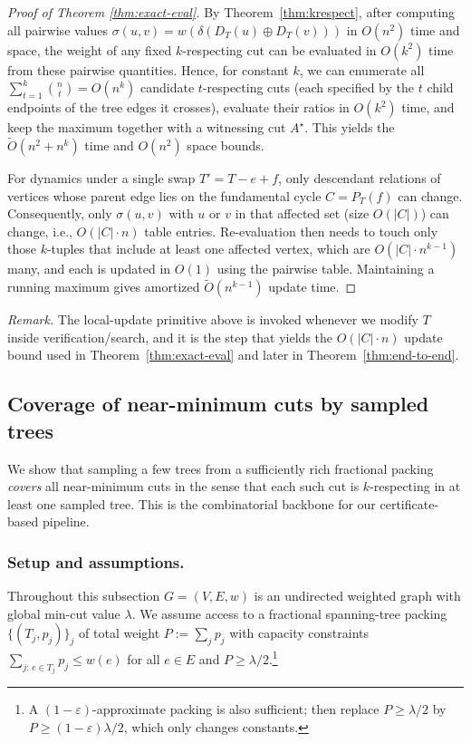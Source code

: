 \documentclass[11pt,letterpaper]{article}
\begin{document}
\begin{proof}[Proof of Theorem \ref{thm:exact-eval}]
By Theorem~\ref{thm:krespect}, after computing all pairwise
values $\sigma(u,v)=w(\delta(D_T(u)\oplus D_T(v)))$ in $O(n^2)$ time
and space, the weight of any fixed $k$-respecting cut can be evaluated
in $O(k^2)$ time from these pairwise quantities. Hence, for constant $k$,
we can enumerate all $\sum_{t=1}^k \binom{n}{t}=O(n^k)$ candidate
$t$-respecting cuts (each specified by the $t$ child endpoints of the
tree edges it crosses), evaluate their ratios in $O(k^2)$ time, and keep
the maximum together with a witnessing cut $A^\star$. This yields the
$\tilde O(n^{2}+n^k)$ time and $O(n^2)$ space bounds.

For dynamics under a single swap $T' = T-e+f$, only descendant
relations of vertices whose parent edge lies on the fundamental cycle
$C=P_T(f)$ can change. Consequently, only $\sigma(u,v)$ with
$u$ or $v$ in that affected set (size $O(|C|)$) can change, i.e.,
$O(|C|\cdot n)$ table entries. Re-evaluation then needs to touch only
those $k$-tuples that include at least one affected vertex, which are
$O(|C|\cdot n^{k-1})$ many, and each is updated in $O(1)$ using the
pairwise table. Maintaining a running maximum gives amortized
$\tilde O(n^{k-1})$ update time.
\end{proof}

\medskip
\noindent
\textit{Remark.} The local-update primitive above is invoked
whenever we modify $T$ inside verification/search, and it is the step that yields the
$O(|C|\cdot n)$ update bound used in Theorem~\ref{thm:exact-eval} and later in
Theorem~\ref{thm:end-to-end}.

\subsection{Coverage of near-minimum cuts by sampled trees}
\label{sec:coverage}

We show that sampling a few trees from a sufficiently rich fractional packing
\emph{covers} all near-minimum cuts in the sense that each such cut is
$k$-respecting in at least one sampled tree. This is the combinatorial backbone
for our certificate-based pipeline.

\subsubsection{Setup and assumptions.}
Throughout this subsection $G=(V,E,w)$ is an undirected weighted graph with
global min-cut value $\lambda$. We assume access to a fractional spanning-tree
packing $\{(T_j,p_j)\}_j$ of total weight $P:=\sum_j p_j$ with capacity
constraints $\sum_{j:\,e\in T_j} p_j \le w(e)$ for all $e\in E$ and
$P \ge \lambda/2$.\footnote{A $(1-\varepsilon)$-approximate packing is also
sufficient; then replace $P\ge \lambda/2$ by $P\ge (1-\varepsilon)\lambda/2$,
which only changes constants.}
\end{document}
